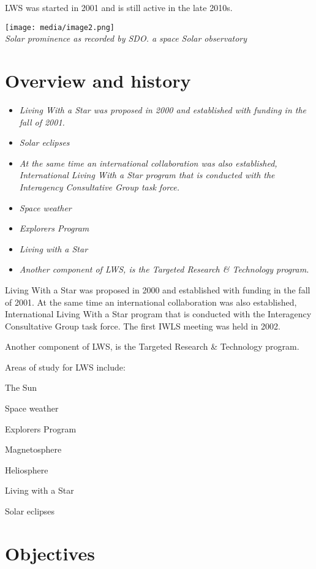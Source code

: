 LWS was started in 2001 and is still active in the late 2010s.

\texttt{[image: media/image2.png]}\\
\emph{Solar prominence as recorded by SDO. a space Solar observatory}

\section{Overview and history}\label{overview-and-history}

\begin{itemize}
\item
  \emph{Living With a Star was proposed in 2000 and established with
  funding in the fall of 2001.}
\item
  \emph{Solar eclipses}
\item
  \emph{At the same time an international collaboration was also
  established, International Living With a Star program that is
  conducted with the Interagency Consultative Group task force.}
\item
  \emph{Space weather}
\item
  \emph{Explorers Program}
\item
  \emph{Living with a Star}
\item
  \emph{Another component of LWS, is the Targeted Research \& Technology
  program.}
\end{itemize}

Living With a Star was proposed in 2000 and established with funding in
the fall of 2001. At the same time an international collaboration was
also established, International Living With a Star program that is
conducted with the Interagency Consultative Group task force. The first
IWLS meeting was held in 2002.

Another component of LWS, is the Targeted Research \& Technology
program.

Areas of study for LWS include:

The Sun

Space weather

Explorers Program

Magnetosphere

Heliosphere

Living with a Star

Solar eclipses

\section{Objectives}\label{objectives}

